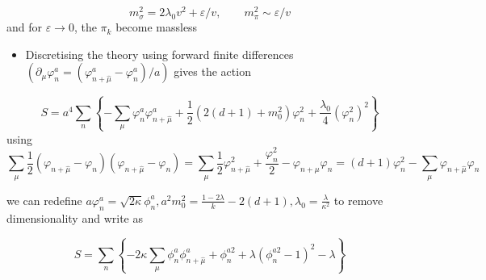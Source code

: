 \begin{equation}
m_{\sigma}^2=2 \lambda_0 v^2+\varepsilon / v, \qquad m_{\pi}^{2} \sim \varepsilon / v
\end{equation}
%
and for \(\varepsilon \rightarrow 0\), the \(\pi_{k}\) become massless

\begin{itemize}
  \item Discretising the theory using forward finite differences \(\left(\partial_{\mu} \varphi_{n}^{a}=\left(\varphi_{n+\hat{\mu}}^{a}-\varphi_{n}^{a}\right) / a\right)\) gives the action
\end{itemize}

\begin{equation}
S=a^{4} \sum_{n}\left\{-\sum_{\mu} \varphi_{n}^{a} \varphi_{n+\hat{\mu}}^{a}+\frac{1}{2}\left(2(d+1)+m_{0}^{2}\right) \varphi_{n}^{2}+\frac{\lambda_{0}}{4}\left(\varphi_{n}^{2}\right)^{2}\right\}
\end{equation}
using
\begin{equation}
\sum_\mu \frac{1}{2}\left(\varphi_{n+\hat \mu}-\varphi_{n}\right)\left(\varphi_{n+\hat\mu}-\varphi_{n}\right)=\sum_\mu \frac{1}{2} \varphi_{n+\hat \mu}^{2}+\frac{\varphi_{n}^{2}}{2}-\varphi_{n+\mu} \varphi_{n}=(d+1) \varphi_{n}^{2}-\sum_\mu \varphi_{n+\hat\mu} \varphi_{n}
\end{equation}

we can redefine \(a \varphi_{n}^{a}=\sqrt{2 \kappa} \phi_{n}^{a}, a^{2} m_{0}^{2}=\frac{1-2\lambda}{k}-2(d+1), \lambda_0 = \frac{\lambda}{\kappa^2}\) to remove dimensionality and write as


\begin{equation}
S=\sum_{n}\left\{-2 \kappa \sum_{\mu} \phi_{n}^{a} \phi_{n+\hat{\mu}}^{a}+\phi_{n}^{a 2}+\lambda\left(\phi_{n}^{a 2}-1\right)^{2}-\lambda\right\}
\label{eq:S_scalar_kappa}
\end{equation}

